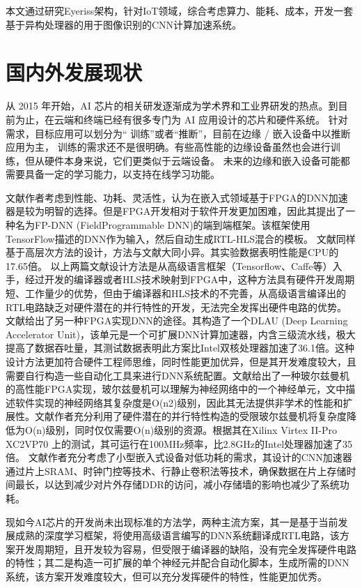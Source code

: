     本文通过研究Eyeriss架构，针对IoT领域，综合考虑算力、能耗、成本，开发一套基于异构处理器的用于图像识别的CNN计算加速系统。

\section{国内外发展现状}
    从 2015 年开始，AI 芯片的相关研发逐渐成为学术界和工业界研发的热点。到目前为止，在云端和终端已经有很多专门为 AI 应用设计的芯片和硬件系统。
    针对需求，目标应用可以划分为“ 训练”或者“推断”，目前在边缘 / 嵌入设备中以推断应用为主，
    训练的需求还不是很明确。有些高性能的边缘设备虽然也会进行训练，但从硬件本身来说，它们更类似于云端设备。
    未来的边缘和嵌入设备可能都需要具备一定的学习能力，以支持在线学习功能。

    文献\cite{liu2015fpga}作者考虑到性能、功耗、灵活性，认为在嵌入式领域基于FPGA的DNN加速器是较为明智的选择。但是FPGA开发相对于软件开发更加困难，因此其提出了一种名为FP-DNN (FieldProgrammable DNN)的端到端框架。该框架使用TensorFlow描述的DNN作为输入，然后自动生成RTL-HLS混合的模板。
    文献\cite{zhang2018accdnn}同样基于高层次方法的设计，方法与文献\cite{liu2015fpga}大同小异。其实验数据表明性能是CPU的17.65倍。
    以上两篇文献设计方法是从高级语言框架（Tensorflow、Caffe等）入手，经过开发的编译器或者HLS技术映射到FPGA中，这种方法具有硬件开发周期短、工作量少的优势，但由于编译器和HLS技术的不完善，从高级语言编译出的RTL电路缺乏对硬件潜在的并行特性的开发，无法完全发挥出硬件电路的优势。
    文献\cite{wang2017dlau}给出了另一种FPGA实现DNN的途径。其构造了一个DLAU (Deep Learning Accelerator Unit)，该单元是一个可扩展DNN计算加速器，内含三级流水线，极大提高了数据吞吐量，其测试数据表明此方案比Intel双核处理器加速了36.1倍。这种设计方法更加符合硬件工程师思维，同时性能更加优异，但是其开发难度较大，且需要自行构造一些自动化工具来进行DNN系统配置。文献\cite{zhang2015optimizing}给出了一种玻尔兹曼机的高性能FPGA实现，玻尔兹曼机可以理解为神经网络中的一个神经单元，文中描述软件实现的神经网络其复杂度是O(n2)级别，因此其无法提供非学术的性能和扩展性。文献作者充分利用了硬件潜在的并行特性构造的受限玻尔兹曼机将复杂度降低为O(n)级别，同时仅仅需要O(n)级别的资源。根据其在Xilinx Virtex II-Pro XC2VP70 上的测试，其可运行在100MHz频率，比2.8GHz的Intel处理器加速了35倍。
    文献\cite{chen2017eyeriss}作者充分考虑了小型嵌入式设备对低功耗的需求，其设计的CNN加速器通过片上SRAM、时钟门控等技术、行静止卷积法等技术，确保数据在片上存储时间最长，以达到减少对片外存储DDR的访问，减小存储墙的影响也减少了系统功耗。
    
    现如今AI芯片的开发尚未出现标准的方法学，两种主流方案，其一是基于当前发展成熟的深度学习框架，将使用高级语言编写的DNN系统翻译成RTL电路，该方案开发周期短，且开发较为容易，但受限于编译器的缺陷，没有完全发挥硬件电路的特性；其二是构造一可扩展的单个神经元并配合自动化脚本，生成所需的DNN系统，该方案开发难度较大，但可以充分发挥硬件的特性，性能更加优秀。


